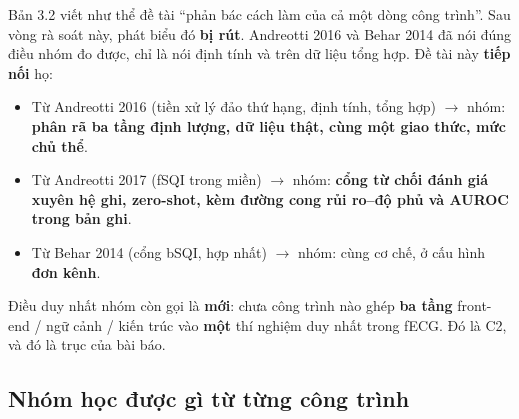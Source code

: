 \begin{ghichu}[title={Nhóm định vị lại đề tài: TIẾP NỐI, không phản bác}]
Bản 3.2 viết như thể đề tài ``phản bác cách làm của cả một dòng công trình''. Sau vòng rà soát này,
phát biểu đó \textbf{bị rút}. Andreotti 2016 và Behar 2014 đã nói đúng điều nhóm đo được, chỉ là nói
định tính và trên dữ liệu tổng hợp. Đề tài này \textbf{tiếp nối} họ:

\begin{itemize}[leftmargin=1.5em,itemsep=2pt]
\item Từ Andreotti 2016 (tiền xử lý đảo thứ hạng, định tính, tổng hợp) $\to$ nhóm: \textbf{phân rã ba
tầng định lượng, dữ liệu thật, cùng một giao thức, mức chủ thể}.
\item Từ Andreotti 2017 (fSQI trong miền) $\to$ nhóm: \textbf{cổng từ chối đánh giá xuyên hệ ghi,
zero-shot, kèm đường cong rủi ro--độ phủ và AUROC trong bản ghi}.
\item Từ Behar 2014 (cổng bSQI, hợp nhất) $\to$ nhóm: cùng cơ chế, ở cấu hình \textbf{đơn kênh}.
\end{itemize}

Điều duy nhất nhóm còn gọi là \textbf{mới}: chưa công trình nào ghép \textbf{ba tầng} front-end / ngữ
cảnh / kiến trúc vào \textbf{một} thí nghiệm duy nhất trong fECG. Đó là C2, và đó là trục của bài báo.
\end{ghichu}

\subsection{Nhóm học được gì từ từng công trình}


